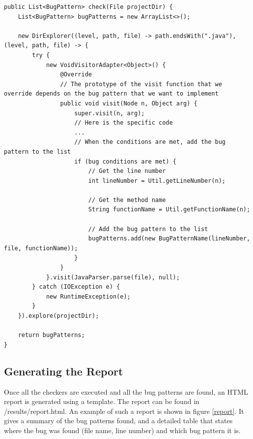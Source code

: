 \documentclass[sigconf]{acmart}
\begin{document}
\begin{lstlisting}[caption={Excerpt of the \texttt{check} function common to each checker},captionpos=b,label={lst:checker}]
public List<BugPattern> check(File projectDir) {
    List<BugPattern> bugPatterns = new ArrayList<>();

    new DirExplorer((level, path, file) -> path.endsWith(".java"), (level, path, file) -> {
        try {
            new VoidVisitorAdapter<Object>() {
                @Override
                // The prototype of the visit function that we override depends on the bug pattern that we want to implement
                public void visit(Node n, Object arg) {
                    super.visit(n, arg);
                    // Here is the specific code
                    ...
                    // When the conditions are met, add the bug pattern to the list
                    if (bug conditions are met) {
                        // Get the line number
                        int lineNumber = Util.getLineNumber(n);

                        // Get the method name
                        String functionName = Util.getFunctionName(n);

                        // Add the bug pattern to the list
                        bugPatterns.add(new BugPatternName(lineNumber, file, functionName));
                    }
                }
            }.visit(JavaParser.parse(file), null);
        } catch (IOException e) {
            new RuntimeException(e);
        }
    }).explore(projectDir);

    return bugPatterns;
}
\end{lstlisting}

\newpage
\noindent

\subsection{Generating the Report} Once all the checkers are executed and all the bug patterns are found, an HTML report is generated using a template. The report can be found in /results/report.html. An example of such a report is shown in figure \ref{report}. It gives a summary of the bug patterns found, and a detailed table that states where the bug was found (file name, line number) and which bug pattern it is.
\end{document}
